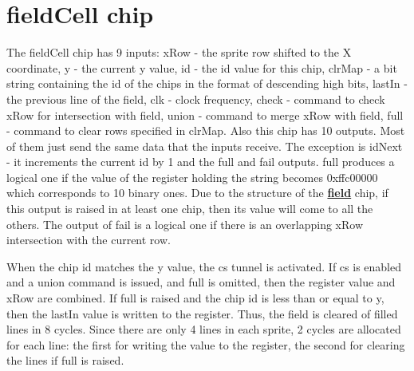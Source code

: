 \documentclass[./main.tex]{subfiles}
\begin{document}
	\section{fieldCell chip}
	
	The fieldCell chip has 9 inputs: xRow - the sprite row shifted to the X coordinate, y - the current y value, id - the id value for this chip, clrMap - a bit string containing the id of the chips in the format of descending high bits, lastIn - the previous line of the field, clk - clock frequency, check - command to check xRow for intersection with field, union - command to merge xRow with field, full - command to clear rows specified in clrMap. Also this chip has 10 outputs. Most of them just send the same data that the inputs receive. The exception is idNext - it increments the current id by 1 and the full and fail outputs. full produces a logical one if the value of the register holding the string becomes 0xffc00000 which corresponds to 10 binary ones. Due to the structure of the \hyperref[sec:field]{\textbf{field}} chip, if this output is raised in at least one chip, then its value will come to all the others. The output of fail is a logical one if there is an overlapping xRow intersection with the current row.
	
	When the chip id matches the y value, the cs tunnel is activated. If cs is enabled and a union command is issued, and full is omitted, then the register value and xRow are combined. If full is raised and the chip id is less than or equal to y, then the lastIn value is written to the register. Thus, the field is cleared of filled lines in 8 cycles. Since there are only 4 lines in each sprite, 2 cycles are allocated for each line: the first for writing the value to the register, the second for clearing the lines if full is raised.
\end{document}
